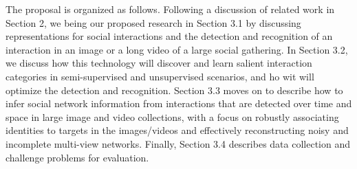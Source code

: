 The proposal is organized as follows. Following a discussion of related work in Section 2, we being our proposed research in Section 3.1 by discussing representations for social interactions and the detection and recognition of an interaction in an image or a long video of a large social gathering. In Section 3.2, we discuss how this technology will  discover and learn salient interaction categories in semi-supervised and unsupervised scenarios, and ho wit will optimize the detection and recognition. Section 3.3 moves on to describe how to infer social network information from interactions that are detected over time and space in large image and video collections, with a focus on robustly associating identities to targets in the images/videos and effectively reconstructing noisy and incomplete multi-view networks. Finally, Section 3.4 describes data collection and challenge problems for evaluation.



